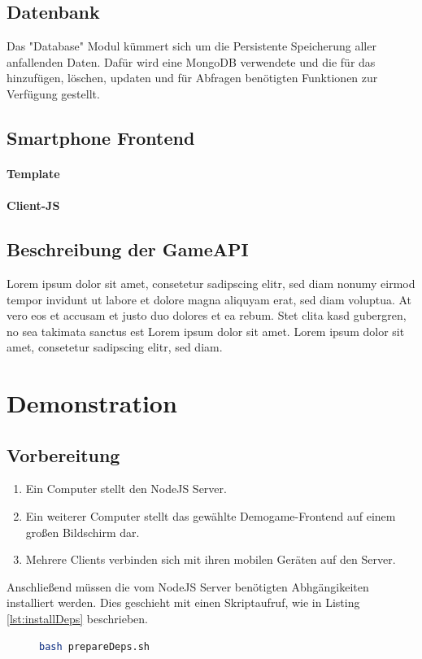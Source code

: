 \documentclass[a4paper]{spie}  %
\begin{document}
\subsection{Datenbank}
Das "Database" Modul kümmert sich um die Persistente Speicherung aller anfallenden Daten. Dafür wird eine MongoDB verwendete und die für das hinzufügen, löschen, updaten und für Abfragen benötigten Funktionen zur Verfügung gestellt.

\subsection{Smartphone Frontend}
\paragraph{Template} %
\paragraph{Client-JS} %

\subsection{Beschreibung der GameAPI} %
Lorem ipsum dolor sit amet, consetetur sadipscing elitr, sed diam nonumy eirmod tempor invidunt ut labore et dolore magna aliquyam erat, sed diam voluptua. At vero eos et accusam et justo duo dolores et ea rebum. Stet clita kasd gubergren, no sea takimata sanctus est Lorem ipsum dolor sit amet. Lorem ipsum dolor sit amet, consetetur sadipscing elitr, sed diam.


\section{Demonstration} %
\subsection{Vorbereitung}
\begin{enumerate}
 \item Ein Computer stellt den NodeJS Server.
 \item Ein weiterer Computer stellt das gewählte Demogame-Frontend auf einem großen Bildschirm dar.
 \item Mehrere Clients verbinden sich mit ihren mobilen Geräten auf den Server.
\end{enumerate}
Anschließend müssen die vom NodeJS Server benötigten Abhgängikeiten installiert werden. Dies geschieht mit einen Skriptaufruf, wie in Listing \ref{lst:installDeps} beschrieben.
\lstset{
  numbers=left,
  stepnumber=5,
  firstnumber=1,
  numberfirstline=true
}
\begin{figure}[h!]
	\centering
        \begin{lstlisting}[language=bash,caption={Installieren der Abhängigkeitenn},label={lst:installDeps}]
           bash prepareDeps.sh
        \end{lstlisting}
\end{figure}
\end{document}
